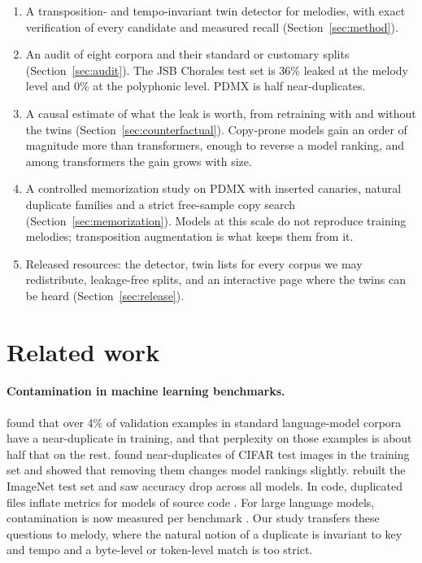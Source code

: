 \documentclass[ProofPDF]{./Styles/Jnls-Template-V3}
\begin{document}
\begin{enumerate}
\item A transposition- and tempo-invariant twin detector for melodies, with exact verification of every candidate and measured recall (Section~\ref{sec:method}).
\item An audit of eight corpora and their standard or customary splits (Section~\ref{sec:audit}). The JSB Chorales test set is 36\% leaked at the melody level and 0\% at the polyphonic level. PDMX is half near-duplicates.
\item A causal estimate of what the leak is worth, from retraining with and without the twins (Section~\ref{sec:counterfactual}). Copy-prone models gain an order of magnitude more than transformers, enough to reverse a model ranking, and among transformers the gain grows with size.
\item A controlled memorization study on PDMX with inserted canaries, natural duplicate families and a strict free-sample copy search (Section~\ref{sec:memorization}). Models at this scale do not reproduce training melodies; transposition augmentation is what keeps them from it.
\item Released resources: the detector, twin lists for every corpus we may redistribute, leakage-free splits, and an interactive page where the twins can be heard (Section~\ref{sec:release}).
\end{enumerate}

\section{Related work}\label{sec:related}

\paragraph{Contamination in machine learning benchmarks.} \cite{lee2022dedup} found that over 4\% of validation examples in standard language-model corpora have a near-duplicate in training, and that perplexity on those examples is about half that on the rest. \cite{barz2020cifar} found near-duplicates of CIFAR test images in the training set and showed that removing them changes model rankings slightly. \cite{recht2019imagenet} rebuilt the ImageNet test set and saw accuracy drop across all models. In code, duplicated files inflate metrics for models of source code \citep{allamanis2019duplication}. For large language models, contamination is now measured per benchmark \citep{magar2022contamination,sainz2023contamination}. Our study transfers these questions to melody, where the natural notion of a duplicate is invariant to key and tempo and a byte-level or token-level match is too strict.
\end{document}
